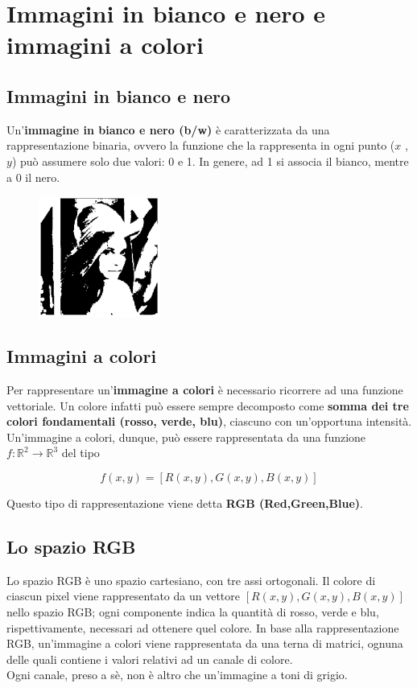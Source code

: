 \section{Immagini in bianco e nero e immagini a colori}

\subsection{Immagini in bianco e nero}

Un'\textbf{immagine in bianco e nero (b/w)} è caratterizzata da una
rappresentazione binaria, ovvero la funzione che la rappresenta in
ogni punto ($x$ , $y$) può assumere solo due valori: 0 e 1. In genere,
ad 1 si associa il bianco, mentre a 0 il nero.

\begin{figure}[H]
    \centering
    \includegraphics[width=4cm, keepaspectratio]{capitoli/immagini/imgs/immagine_binaria_bianco_nero.jpg}
\end{figure}

\subsection{Immagini a colori}

Per rappresentare un'\textbf{immagine a colori} è necessario ricorrere ad
una funzione vettoriale. Un colore infatti può essere sempre
decomposto come \textbf{somma dei tre colori fondamentali (rosso, verde,
    blu)}, ciascuno con un'opportuna intensità.
Un'immagine a colori, dunque, può essere rappresentata da una
funzione $f: \mathbb{R}^2 \rightarrow \mathbb{R}^3$ del tipo

$$
    f(x, y) = [R(x, y), G(x, y), B(x, y)]
$$

Questo tipo di rappresentazione viene detta \textbf{RGB (Red,Green,Blue)}.
\subsection{Lo spazio RGB}

Lo spazio RGB è uno spazio cartesiano, con tre assi ortogonali.
Il colore di ciascun pixel viene rappresentato da un vettore
$[R(x , y), G(x , y), B(x , y)]$ nello spazio RGB; ogni componente
indica la quantità di rosso, verde e blu, rispettivamente, necessari
ad ottenere quel colore.
In base alla rappresentazione RGB, un'immagine a colori viene
rappresentata da una terna di matrici, ognuna delle quali contiene i
valori relativi ad un canale di colore.\\
Ogni canale, preso a sè, non è altro che un'immagine a toni di
grigio.

